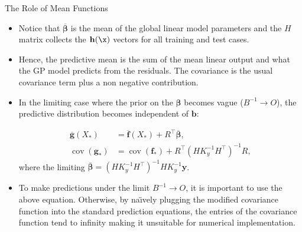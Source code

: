 \begin{frame}[c,allowframebreaks]{The Role of Mean Functions}
\begin{itemize}
\vspace{4mm}
\item Notice that $\overline{\boldsymbol{\beta}}$ is the mean of the global linear model parameters and the $H$ matrix collects the $\mathbf{h}(\x)$ vectors for all training and test cases.

\vspace{4mm}
\item Hence, the predictive mean is the sum of the mean linear output and what the GP model predicts from the residuals. The covariance is the usual covariance term plus a non negative contribution.
\end{itemize}

\framebreak

\begin{itemize}

\item In the limiting case where the prior on the $\boldsymbol{\beta}$ becomes vague ($B^{-1} \rightarrow O$), the predictive distribution becomes independent of $\boldsymbol{b}$:
\vspace{-2mm}

$$\begin{aligned} 
\overline{\mathbf{g}}\left(X_{*}\right) &=\overline{\mathbf{f}}\left(X_{*}\right)+R^{\top} \overline{\boldsymbol{\beta}}, \\
\operatorname{cov}\left(\mathbf{g}_{*}\right) &=\operatorname{cov}(\mathbf{f}_{*})+R^{\top}(H K_{y}^{-1} H^{\top})^{-1} R, 
\end{aligned}
$$ where the limiting $\overline{\boldsymbol{\beta}}=(H K_{y}^{-1} H^{\top})^{-1} H K_{y}^{-1} \mathbf{y}$.

\vspace{1cm}

\item To make predictions under the limit $B^{-1} \rightarrow O$, it is important to use the above equation. Otherwise, by na{\"\i}vely plugging the modified covariance function into the standard prediction equations, the entries of the covariance function tend to infinity making it unsuitable for numerical implementation.

\end{itemize}

\framebreak
\begin{itemize}


\end{itemize}
\end{frame}
